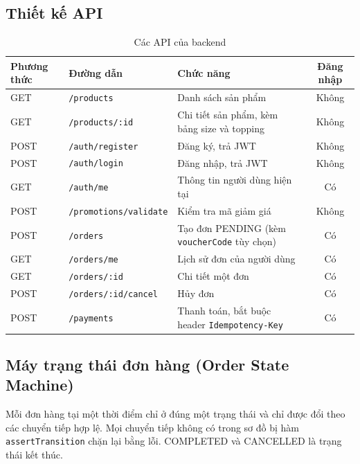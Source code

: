 \documentclass[a4paper]{article}
\begin{document}
\subsection{Thiết kế API}
\begin{table}[h!]
\centering
\footnotesize
\begin{tabularx}{\textwidth}{|l|l|X|c|}
\hline
\textbf{Phương thức} & \textbf{Đường dẫn} & \textbf{Chức năng} & \textbf{Đăng nhập} \\ \hline
GET & \texttt{/products} & Danh sách sản phẩm & Không \\ \hline
GET & \texttt{/products/:id} & Chi tiết sản phẩm, kèm bảng size và topping & Không \\ \hline
POST & \texttt{/auth/register} & Đăng ký, trả JWT & Không \\ \hline
POST & \texttt{/auth/login} & Đăng nhập, trả JWT & Không \\ \hline
GET & \texttt{/auth/me} & Thông tin người dùng hiện tại & Có \\ \hline
POST & \texttt{/promotions/validate} & Kiểm tra mã giảm giá & Không \\ \hline
POST & \texttt{/orders} & Tạo đơn PENDING (kèm \texttt{voucherCode} tùy chọn) & Có \\ \hline
GET & \texttt{/orders/me} & Lịch sử đơn của người dùng & Có \\ \hline
GET & \texttt{/orders/:id} & Chi tiết một đơn & Có \\ \hline
POST & \texttt{/orders/:id/cancel} & Hủy đơn & Có \\ \hline
POST & \texttt{/payments} & Thanh toán, bắt buộc header \texttt{Idempotency-Key} & Có \\ \hline
\end{tabularx}
\caption{Các API của backend}
\end{table}



\subsection{Máy trạng thái đơn hàng (Order State Machine)}
Mỗi đơn hàng tại một thời điểm chỉ ở đúng một trạng thái và chỉ được đổi theo các chuyển tiếp hợp lệ. Mọi chuyển tiếp không có trong sơ đồ bị hàm \texttt{assertTransition} chặn lại bằng lỗi. COMPLETED và CANCELLED là trạng thái kết thúc.
\end{document}
